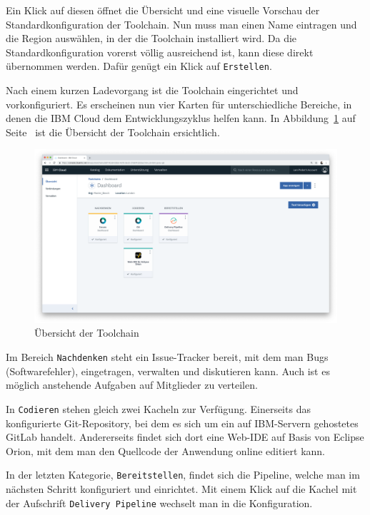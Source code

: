 Ein Klick auf diesen öffnet die Übersicht und eine visuelle Vorschau der Standardkonfiguration der Toolchain. Nun muss
man einen Name eintragen und die Region auswählen, in der die Toolchain installiert wird. Da die Standardkonfiguration
vorerst völlig ausreichend ist, kann diese direkt übernommen werden. Dafür genügt ein Klick auf \texttt{Erstellen}.

Nach einem kurzen Ladevorgang ist die Toolchain eingerichtet und vorkonfiguriert. Es erscheinen nun vier Karten für
unterschiedliche Bereiche, in denen die IBM Cloud dem Entwicklungszyklus helfen kann. In
Abbildung~\ref{fig:umsetzung_toolchain} auf Seite~\pageref{fig:umsetzung_toolchain} ist die Übersicht der Toolchain
ersichtlich.

\begin{figure}[h]
    \centering
    \includegraphics[width=\textwidth]{images/kapitel_3/toolchain_overview.png}
    \caption{Übersicht der Toolchain}
    \label{fig:umsetzung_toolchain}
\end{figure}

Im Bereich \texttt{Nachdenken} steht ein Issue-Tracker bereit, mit dem man Bugs (Softwarefehler), eingetragen,
verwalten und diskutieren kann. Auch ist es möglich anstehende Aufgaben auf Mitglieder zu verteilen.

In \texttt{Codieren} stehen gleich zwei Kacheln zur Verfügung. Einerseits das konfigurierte Git-Repository, bei dem es
sich um ein auf IBM-Servern gehostetes GitLab handelt. Andererseits findet sich dort eine Web-IDE auf Basis von Eclipse
Orion, mit dem man den Quellcode der Anwendung online editiert kann.

In der letzten Kategorie, \texttt{Bereitstellen}, findet sich die Pipeline, welche man im nächsten Schritt konfiguriert
und einrichtet. Mit einem Klick auf die Kachel mit der Aufschrift \texttt{Delivery Pipeline} wechselt man in die
Konfiguration.

